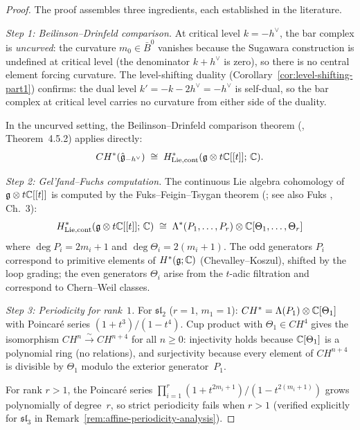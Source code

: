 \begin{proof}
The proof assembles three ingredients, each established in the literature.

\emph{Step 1: Beilinson--Drinfeld comparison.}
At critical level $k = -h^\vee$, the bar complex is \emph{uncurved}:
the curvature $m_0 \in \bar{B}^0$ vanishes because the Sugawara construction
is undefined at critical level (the denominator $k + h^\vee$ is zero), so
there is no central element forcing curvature.  The level-shifting duality
(Corollary~\ref{cor:level-shifting-part1}) confirms: the dual level
$k' = -k - 2h^\vee = -h^\vee$ is self-dual, so the bar complex at
critical level carries no curvature from either side of the duality.

In the uncurved setting, the Beilinson--Drinfeld comparison theorem
(\cite{BD04}, Theorem~4.5.2) applies directly:
\[
CH^*(\hat{\mathfrak{g}}_{-h^\vee}) \;\cong\;
H^*_{\mathrm{Lie,cont}}(\mathfrak{g} \otimes t\mathbb{C}[[t]];\, \mathbb{C}).
\]

\emph{Step 2: Gel'fand--Fuchs computation.}
The continuous Lie algebra cohomology of $\mathfrak{g} \otimes t\mathbb{C}[[t]]$
is computed by the Fuks--Feigin--Tsygan theorem (\cite{FT87}; see also
Fuks \cite{Fuks86}, Ch.~3):
\[
H^*_{\mathrm{Lie,cont}}(\mathfrak{g} \otimes t\mathbb{C}[[t]];\, \mathbb{C}) \;\cong\;
\Lambda^*(P_1, \ldots, P_r) \otimes \mathbb{C}[\Theta_1, \ldots, \Theta_r]
\]
where $\deg P_i = 2m_i + 1$ and $\deg \Theta_i = 2(m_i + 1)$.
The odd generators $P_i$ correspond to primitive elements of
$H^*(\mathfrak{g}; \mathbb{C})$ (Chevalley--Koszul), shifted by the loop grading;
the even generators $\Theta_i$ arise from the $t$-adic filtration and
correspond to Chern--Weil classes.

\emph{Step 3: Periodicity for rank~$1$.}
For $\mathfrak{sl}_2$ ($r = 1$, $m_1 = 1$): $CH^* = \Lambda(P_1) \otimes \mathbb{C}[\Theta_1]$
with Poincar\'e series $(1 + t^3)/(1 - t^4)$.  Cup product with
$\Theta_1 \in CH^4$ gives the isomorphism $CH^n \xrightarrow{\sim} CH^{n+4}$
for all $n \geq 0$: injectivity holds because $\mathbb{C}[\Theta_1]$ is a
polynomial ring (no relations), and surjectivity because every element of
$CH^{n+4}$ is divisible by $\Theta_1$ modulo the exterior generator~$P_1$.

For rank $r > 1$, the Poincar\'e series
$\prod_{i=1}^r (1 + t^{2m_i+1})/(1-t^{2(m_i+1)})$ grows
polynomially of degree~$r$, so strict periodicity fails when
$r > 1$ (verified explicitly for $\mathfrak{sl}_3$ in
Remark~\ref{rem:affine-periodicity-analysis}).
\end{proof}

